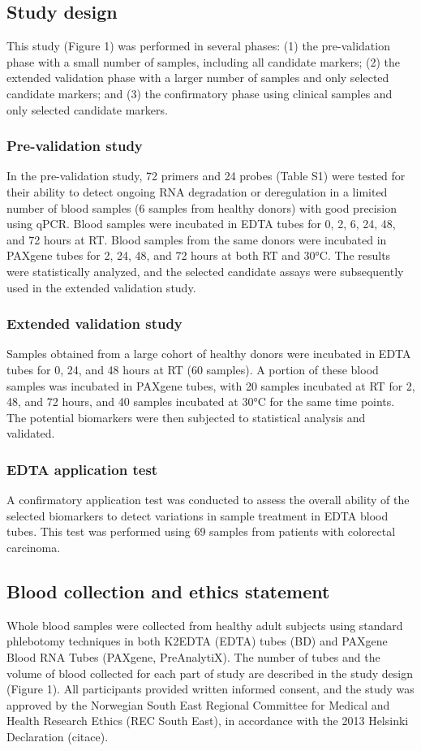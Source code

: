 
\subsection*{Study design}
This study (Figure 1) was performed in several phases: (1) the pre-validation phase with a small number of samples,  including all candidate markers; (2) the extended validation phase with a larger number of samples and only selected candidate markers; and (3) the confirmatory phase using clinical samples and only selected candidate markers. 

\subsubsection*{Pre-validation study}
In the pre-validation study, 72 primers and 24 probes (Table S1) were tested for their ability to detect ongoing RNA degradation or deregulation in a limited number of blood samples (6 samples from healthy donors) with good precision using qPCR. Blood samples were incubated in EDTA tubes for 0, 2, 6, 24, 48, and 72 hours at RT. Blood samples from the same donors were incubated in PAXgene tubes for 2, 24, 48, and 72 hours at both RT and 30°C. The results were statistically analyzed, and the selected candidate assays were subsequently used in the extended validation study.

\subsubsection*{Extended validation study}
Samples obtained from a large cohort of healthy donors were incubated in EDTA tubes for 0, 24, and 48 hours at RT (60 samples). A portion of these blood samples was incubated in PAXgene tubes, with 20 samples incubated at RT for 2, 48, and 72 hours, and 40 samples incubated at 30°C for the same time points. The potential biomarkers were then subjected to statistical analysis and validated.

\subsubsection*{EDTA application test}
A confirmatory application test was conducted to assess the overall ability of the selected biomarkers to detect variations in sample treatment in EDTA blood tubes. This test was performed using 69 samples from patients with colorectal carcinoma.

\subsection*{Blood collection and ethics statement}
Whole blood samples were collected from healthy adult subjects using standard phlebotomy techniques in both K2EDTA (EDTA) tubes (BD) and PAXgene Blood RNA Tubes (PAXgene, PreAnalytiX). The number of tubes and the volume of blood collected for each part of study are described in the study design (Figure 1). All participants provided written informed consent, and the study was approved by the Norwegian South East Regional Committee for Medical and Health Research Ethics (REC South East), in accordance with the 2013 Helsinki Declaration (citace).

